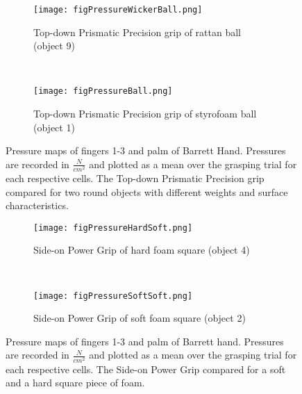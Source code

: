 \begin{figure*}%
        \begin{subfigure}{\textwidth}
        \hspace{-2cm}
                \texttt{[image: figPressureWickerBall.png]}
                \vspace{-0.8cm}
                \caption{Top-down Prismatic Precision grip of rattan ball (object 9)}
        \end{subfigure}\\[1cm]
        \begin{subfigure}{\textwidth}
        \hspace{-2cm}
                \texttt{[image: figPressureBall.png]}
                \vspace{-0.8cm}
                \caption{Top-down Prismatic Precision grip of styrofoam ball (object 1)}
        \end{subfigure}
        \caption{Pressure maps of fingers 1-3 and palm of Barrett Hand. Pressures are recorded in $\frac{N}{cm^2}$ and plotted as a mean over the grasping trial for each respective cells. The Top-down Prismatic Precision grip compared for two round objects with different weights and surface characteristics.}
        \label{WickervsStyro}
\end{figure*}
\cleardoublepage

\begin{figure*}%
        \begin{subfigure}{\textwidth}
		\hspace{-2cm}
                \texttt{[image: figPressureHardSoft.png]}
                \vspace{-0.8cm}
                \caption{Side-on Power Grip of hard foam square (object 4)}
        \end{subfigure}\\[1cm]
        \begin{subfigure}{\textwidth}
        \hspace{-2cm}
                \texttt{[image: figPressureSoftSoft.png]}
                \vspace{-0.8cm}
                \caption{Side-on Power Grip of soft foam square (object 2)}
        \end{subfigure}
        \caption{Pressure maps of fingers 1-3 and palm of Barrett hand. Pressures are recorded in $\frac{N}{cm^2}$ and plotted as a mean over the grasping trial for each respective cells. The Side-on Power Grip compared for a soft and a hard square piece of foam.}
        \label{SoftvsHard}
\end{figure*}
\cleardoublepage


